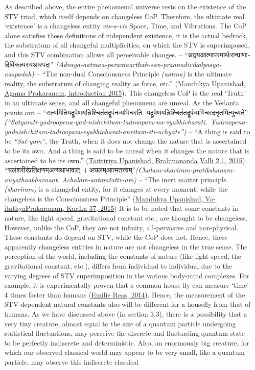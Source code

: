 \documentclass[twoside, 13pt]{article}
\begin{document}
{{As described above, the entire phenomenal universe rests on the existence of the STV triad, which itself depends on changeless CoP. Therefore, the ultimate real ‘existence’ is a changeless entity \textit{vis-a-vis} Space, Time, and Vibrations. The CoP alone satisfies these definitions of independent existence, it is the actual bedrock, the substratum of all changeful multiplicities, on which the STV is superimposed, and this STV combination allows all perceivable changes. – \foreignlanguage{hindi}{{\fontsize{9}{11}\selectfont “अद्वयआत्मापरमार्थःसन्प्राणादिविकल्पस्यआस्पदः”}} \textit{(Advaya-aatmaa-paramaarthah-san-praanadivikalpasya- aaspadah)} – “The non-dual Consciousness Principle \textit{(aatma)} is the ultimate reality, the substratum of changing reality as force, etc.” (\underline{Mandukya Upanishad, Agama Prakaranam, introduction 2015}). This changeless CoP is the real ‘Truth’ in an ultimate sense, and all changeful phenomena are unreal. As the Vedanta points out – \foreignlanguage{hindi}{{\fontsize{9}{11}\selectfont “सत्यमितियद्रूपेणयन्निश्चितंतद्रूपंनव्यभिचरति.  यद्रूपेणयन्निश्चितंतद्रूपंव्यभिचरदनृतमित्युच्यते”}} \textit{(“Satyamti-yadroopena-yad-nishchitam-tadroopam-na-vyabhicharati.~Yadroopena-yad\break nishchitam-tadroopam-vyabhicharat-anritam-iti-uchyate”)} – “A thing is said to be \textit{“Sat-\break yam”}, the Truth, when it does not change the nature that is ascertained to be its own. And a thing is said to be unreal when it changes the nature that is ascertained to be its own.” (\underline{Taittiriya Upanishad, Brahmananda Valli 2.1, 2015}). \foreignlanguage{hindi}{{\fontsize{9}{11}\selectfont “चलंशरीरंप्रतिक्षणम्अन्यथाभावात् । अचलम्आत्मतत्त्वम्”}}\textit{(Chalam-shariram-pratikshanam-anyathaabhavaaat. Achalam-aatmatattv-\break am)} – “The inert matter principle \textit{(shariram)} is a changeful entity, for it changes at every moment, while the changeless is the Consciousness Principle” (\underline{Mandukya Upanishad, Va-} \underline{itathyaPrakaranam, Karika 37, 2015}) It is to be noted that some constants in nature, like light speed, gravitational constant etc., are thought to be changeless. However, unlike the CoP, they are not infinity, all-pervasive and non-physical. These constants do depend on STV, while the CoP does not. Hence, these apparently changeless entities in nature are not changeless in the true sense. The perception of the world, including the constants of nature (like light speed, the gravitational constant, etc.), differs from individual to individual due to the varying degrees of STV superimposition in the various body-mind complexes. For example, it is experimentally proven that a common house ﬂy can measure ‘time’ 4 times faster than humans (\underline{Emilie Reas, 2014}). Hence, the measurement of the STV-dependent natural constants also will be different for a housefly from that of humans. As we have discussed above (in section 3.3), there is a possibility that a very tiny creature, almost equal to the size of a quantum particle undergoing statistical fluctuations, may perceive the discrete and fluctuating quantum state to be perfectly indiscrete and deterministic. Also, an enormously big creature, for which our observed classical world may appear to be very small, like a quantum particle, may observe this indiscrete classical }}
\end{document}
